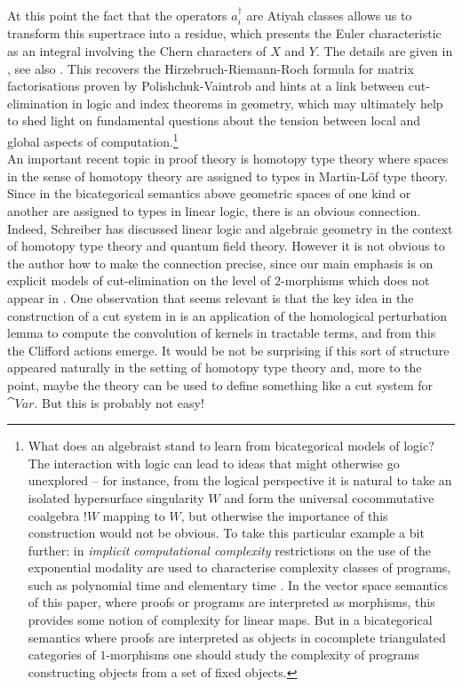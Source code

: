 \documentclass[english,letter paper,12pt,reqno]{article}
\theoremstyle{example}
\numberwithin{equation}{section}
\begin{document}
At this point the fact that the operators $a_i^\dagger$ are Atiyah classes allows us to transform this supertrace into a residue, which presents the Euler characteristic as an integral involving the Chern characters of $X$ and $Y$. The details are given in \cite{dm1102.2957}, see also \cite[Remark 4.13]{murfet}. This recovers the Hirzebruch-Riemann-Roch formula for matrix factorisations proven by Polishchuk-Vaintrob \cite{pv} and hints at a link between cut-elimination in logic and index theorems in geometry, which may ultimately help to shed light on fundamental questions about the tension between local and global aspects of computation.\footnote{What does an algebraist stand to learn from bicategorical models of logic? The interaction with logic can lead to ideas that might otherwise go unexplored -- for instance, from the logical perspective it is natural to take an isolated hypersurface singularity $W$ and form the universal cocommutative coalgebra ${!} W$ mapping to $W$, but otherwise the importance of this construction would not be obvious. To take this particular example a bit further: in \emph{implicit computational complexity} restrictions on the use of the exponential modality are used to characterise complexity classes of programs, such as polynomial time \cite{girard_complexity} and elementary time \cite{danos}. In the vector space semantics of this paper, where proofs or programs are interpreted as morphisms, this provides some notion of complexity for linear maps. But in a bicategorical semantics where proofs are interpreted as objects in cocomplete triangulated categories of $1$-morphisms one should study the complexity of programs constructing objects from a set of fixed objects.}
\\

An important recent topic in proof theory is homotopy type theory \cite{univalent} where spaces in the sense of homotopy theory are assigned to types in Martin-L\"of type theory. Since in the bicategorical semantics above geometric spaces of one kind or another are assigned to types in linear logic, there is an obvious connection. Indeed, Schreiber \cite{schreiber} has discussed linear logic and algebraic geometry in the context of homotopy type theory and quantum field theory. However it is not obvious to the author how to make the connection precise, since our main emphasis is on explicit models of cut-elimination on the level of $2$-morphisms which does not appear in \cite{schreiber}. One observation that seems relevant is that the key idea in the construction of a cut system in \cite{murfet} is an application of the homological perturbation lemma to compute the convolution of kernels in tractable terms, and from this the Clifford actions emerge. It would be not be surprising if this sort of structure appeared naturally in the setting of homotopy type theory and, more to the point, maybe the theory can be used to define something like a cut system for $\cat{V}ar$. But this is probably not easy!
\end{document}
